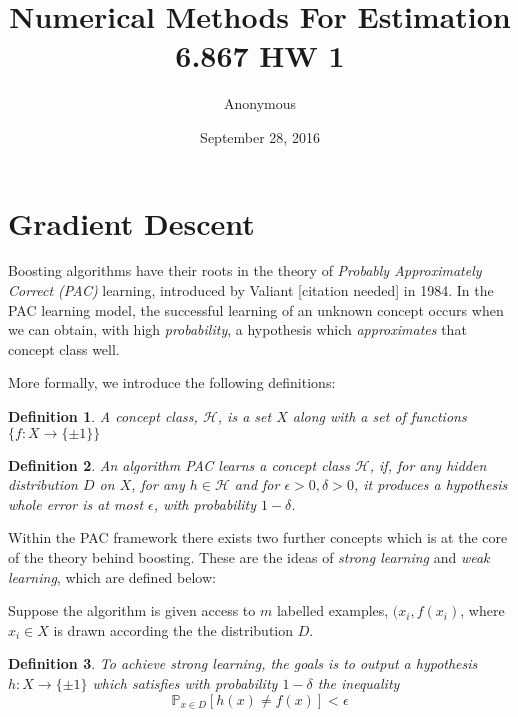 \documentclass[11pt]{article}
\newtheorem{definition}{Definition}[section]
\newcommand{\?}[0]{\vert}
\begin{document}
\title{Numerical Methods For Estimation\\
	6.867 HW 1}

\author{Anonymous}


\date{September 28, 2016}

\maketitle


\section{Gradient Descent}

Boosting algorithms have their roots in the theory of \textit{Probably Approximately Correct (PAC)} learning, introduced by Valiant [citation needed] in 1984. In the PAC learning model, the successful learning of an unknown concept occurs when we can obtain, with high \textit{probability}, a hypothesis which \textit{approximates} that concept class well. 

More formally, we introduce the following definitions:
\vspace{2mm}
\begin{definition}
A \textit{concept class,} $\mathcal{H}$, is a set $X$ along with a set of functions $\{f : X \rightarrow \{\pm 1\}\}$ 
\end{definition}
\vspace{2mm}
\begin{definition}
An algorithm \textit{PAC learns} a concept class $\mathcal{H}$, if, for any hidden distribution $D$ on $X$, for any $h \in \mathcal{H}$  and for $\epsilon>0,\delta >0$,  it produces a hypothesis whole error is at most $\epsilon$, with probability $1- \delta$. 
\end{definition}

Within the PAC framework there exists two further concepts which is at the core of the theory behind boosting. These are the ideas of \textit{strong learning} and \textit{weak learning}, which are defined below:

Suppose the algorithm is given access to $m$ labelled examples, $(x_i, f(x_i)$, where $x_i \in X$ is drawn according the the distribution $D$. 
\vspace{2mm}
\begin{definition}
To achieve \textit{strong learning}, the goals is to output a hypothesis $h: X \rightarrow \{\pm 1 \}$ which satisfies with probability $1-\delta$ the inequality $$\mathbb{P}_{x\in D}[h(x)\neq f(x)] < \epsilon$$

\end{definition}
\end{document}
